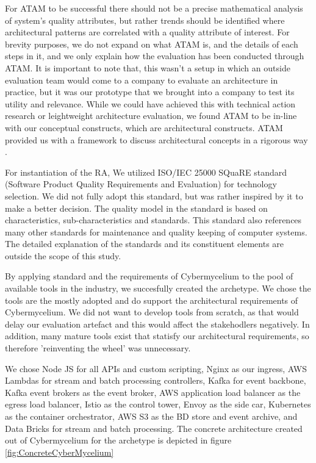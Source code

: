 \documentclass[review]{elsarticle}
\begin{document}
For ATAM to be successful there should not be a precise mathematical analysis of system's quality attributes, but rather trends should be identified where architectural patterns are correlated with a quality attribute of interest. For brevity purposes, we do not expand on what ATAM is, and the details of each steps in it, and we only explain how the evaluation has been conducted through ATAM. It is important to note that, this wasn't a setup in which an outside evaluation team would come to a company to evaluate an architecture in practice, but it was our prototype that we brought into a company to test its utility and relevance. While we could have achieved this with technical action research or leightweight architecture evaluation, we found ATAM to be in-line with our conceptual constructs, which are architectural constructs. ATAM provided us with a framework to discuss architectural concepts in a rigorous way \cite{wieringa2014design}.

For instantiation of the RA, We utilized ISO/IEC 25000 SQuaRE standard (Software Product Quality Requirements and Evaluation) \cite{ISO25000} for technology selection.  We did not fully adopt this standard, but was rather inspired by it to make a better decision. The quality model in the standard is based on characteristics, sub-characteristics and standards. This standard also references many other standards for maintenance and quality keeping of computer systems. The detailed explanation of the standards and its constituent elements are outside the scope of this study.

By applying standard and the requirements of Cybermycelium to the pool of available tools in the industry, we succesfully created the archetype. We chose the tools are the mostly adopted and do support the architectural requirements of Cybermycelium. We did not want to develop tools from scratch, as that would delay our evaluation artefact and this would affect the stakehodlers negatively. In addition, many mature tools exist that statisfy our architectural requirements, so therefore 'reinventing the wheel' was unnecessary.

We chose Node JS for all APIs and custom scripting, Nginx as our ingress, AWS Lambdas for stream and batch processing controllers, Kafka for event backbone, Kafka event brokers as the event broker, AWS application load balancer as the egress load balancer, Istio as the control tower, Envoy as the side car, Kubernetes as the container orchestrator, AWS S3 as the BD store and event archive, and Data Bricks for stream and batch processing. The concrete architecture created out of Cybermycelium for the archetype is depicted in figure \ref{fig:ConcreteCyberMycelium}
\end{document}
